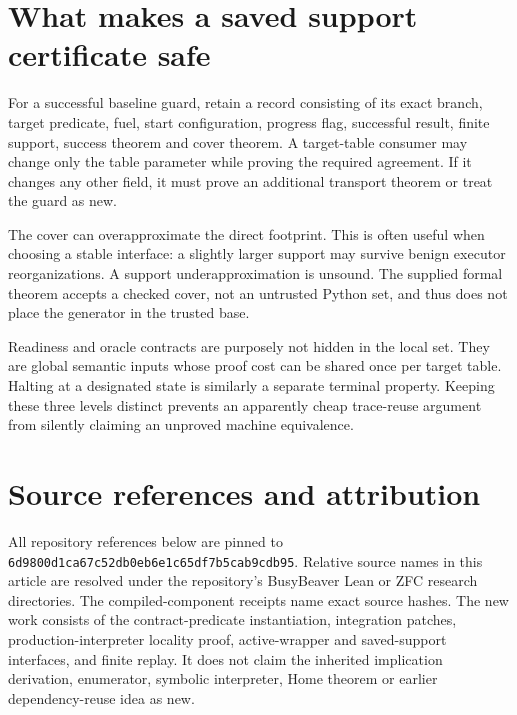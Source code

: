 \documentclass[11pt]{article}
\theoremstyle{definition}\newtheorem{definition}[theorem]{Definition}
\newcommand{\code}[1]{\texttt{#1}}
\newcommand{\pin}{6d9800d1ca67c52db0eb6e1c65df7b5cab9cdb95}
\begin{document}
\section{What makes a saved support certificate safe}

For a successful baseline guard, retain a record consisting of its exact
branch, target predicate, fuel, start configuration, progress flag, successful
result, finite support, success theorem and cover theorem. A target-table
consumer may change only the table parameter while proving the required
agreement. If it changes any other field, it must prove an additional transport
theorem or treat the guard as new.

The cover can overapproximate the direct footprint. This is often useful when
choosing a stable interface: a slightly larger support may survive benign
executor reorganizations. A support underapproximation is unsound. The supplied
formal theorem accepts a checked cover, not an untrusted Python set, and thus
does not place the generator in the trusted base.

Readiness and oracle contracts are purposely not hidden in the local set.
They are global semantic inputs whose proof cost can be shared once per
target table. Halting at a designated state is similarly a separate terminal
property. Keeping these three levels distinct prevents an apparently cheap
trace-reuse argument from silently claiming an unproved machine equivalence.

\section{Source references and attribution}

All repository references below are pinned to \code{\pin}. Relative source
names in this article are resolved under the repository's BusyBeaver Lean or
ZFC research directories. The compiled-component receipts name exact source
hashes. The new work consists of the contract-predicate instantiation,
integration patches, production-interpreter locality proof, active-wrapper and
saved-support interfaces, and finite replay. It does not claim the inherited
implication derivation, enumerator, symbolic interpreter, Home theorem or
earlier dependency-reuse idea as new.
\end{document}
